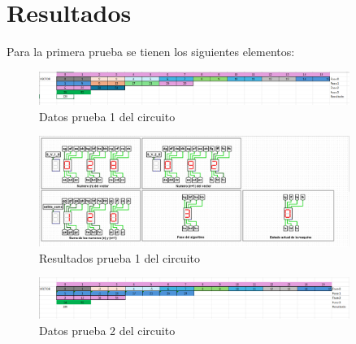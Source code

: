 \documentclass{article}
\begin{document}
\section{Resultados}
Para la primera prueba se tienen los siguientes elementos:
\begin{figure}[h] %
    \centering
    \includegraphics[width=0.9\textwidth]{imagenes/prueba_1.png} %
    \caption{Datos prueba 1 del circuito} %
    \label{fig:prueba1} %
\end{figure}
\begin{figure}[h] %
    \centering
    \includegraphics[width=0.9\textwidth]{imagenes/resultado_1.png} %
    \caption{Resultados prueba 1 del circuito} %
    \label{fig:resultado1} %
\end{figure}
\begin{figure}[h] %
    \centering
    \includegraphics[width=0.9\textwidth]{imagenes/prueba_2.png} %
    \caption{Datos prueba 2 del circuito} %
    \label{fig:prueba2} %
\end{figure}
\newpage
\end{document}
